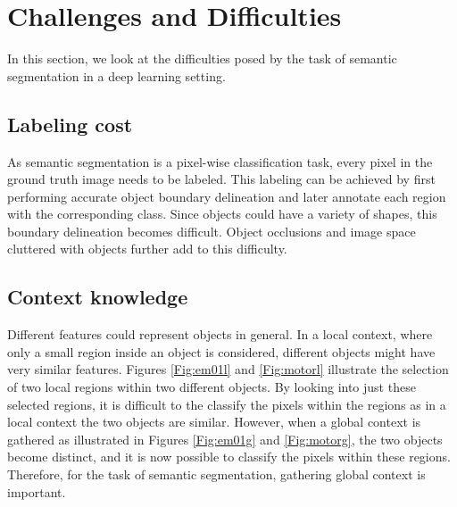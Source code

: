 \section{Challenges and Difficulties}

In this section, we look at the difficulties posed by the task of semantic segmentation in a deep learning setting.

\subsection{Labeling cost}

As semantic segmentation is a pixel-wise classification task, every pixel in the ground truth image needs to be labeled. This labeling can be achieved by first performing accurate object boundary delineation and later annotate each region with the corresponding class. Since objects could have a variety of shapes, this boundary delineation becomes difficult. Object occlusions and image space cluttered with objects further add to this difficulty.

\subsection{Context knowledge}

Different features could represent objects in general. In a local context, where only a small region inside an object is considered, different objects might have very similar features. Figures \ref{Fig:em01l} and \ref{Fig:motorl} illustrate the selection of two local regions within two different objects. By looking into just these selected regions, it is difficult to the classify the pixels within the regions as in a local context the two objects are similar. However, when a global context is gathered as illustrated in Figures \ref{Fig:em01g} and \ref{Fig:motorg}, the two objects become distinct, and it is now possible to classify the pixels within these regions. Therefore, for the task of semantic segmentation, gathering global context is important. 


